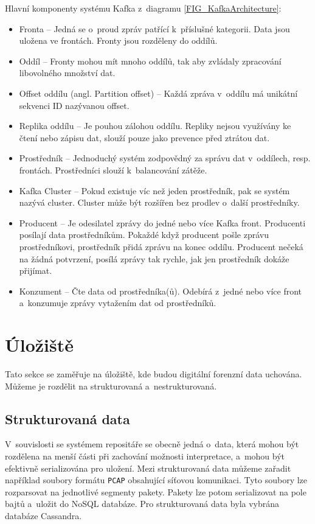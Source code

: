 \vspace{0.5cm}
\noindent Hlavní komponenty systému Kafka z~diagramu \ref{FIG_KafkaArchitecture}:
\begin{itemize}
    \item Fronta -- Jedná se o~proud zpráv patřící k~příslušné kategorii. Data jsou uložena ve frontách. Fronty jsou rozděleny do oddílů.
    
    \item Oddíl -- Fronty mohou mít mnoho oddílů, tak aby zvládaly zpracování libovolného množství dat.

    \item Offset oddílu (angl. Partition offset) -- Každá zpráva v~oddílu má unikátní sekvenci ID nazývanou offset.

    \item Replika oddílu -- Je pouhou zálohou oddílu. Repliky nejsou využívány ke čtení nebo zápisu dat, slouží pouze jako prevence před ztrátou dat.
    
    \item Prostředník -- Jednoduchý systém zodpovědný za správu dat v~oddílech, resp. frontách. Prostředníci slouží k~balancování zátěže.
    
    \item Kafka Cluster -- Pokud existuje víc než jeden prostředník, pak se systém nazývá cluster. Cluster může být rozšířen bez prodlev o~další prostředníky.
    
    \item Producent -- Je odesilatel zprávy do jedné nebo více Kafka front. Producenti posílají data prostředníkům. Pokaždé když producent pošle zprávu prostředníkovi, prostředník přidá zprávu na konec oddílu. Producent nečeká na žádná potvrzení, posílá zprávy tak rychle, jak jen prostředník dokáže přijímat.
    
    \item Konzument -- Čte data od prostředníka(ů). Odebírá z~jedné nebo více front a~konzumuje zprávy vytažením dat od prostředníků.
\end{itemize}

\section{Úložiště}
Tato sekce se zaměřuje na úložiště, kde budou digitální forenzní data uchována. Můžeme je rozdělit na strukturovaná a~nestrukturovaná.

\subsection{Strukturovaná data}
V~souvislosti se systémem repositáře se obecně jedná o~data, která mohou být rozdělena na menší části při zachování možnosti interpretace, a~mohou být efektivně serializována pro uložení. Mezi strukturovaná data můžeme zařadit například soubory formátu \texttt{PCAP} obsahující síťovou komunikaci. Tyto soubory lze rozparsovat na jednotlivé segmenty pakety. Pakety lze potom serializovat na pole bajtů a~uložit do NoSQL databáze. Pro strukturovaná data byla vybrána databáze Cassandra.


